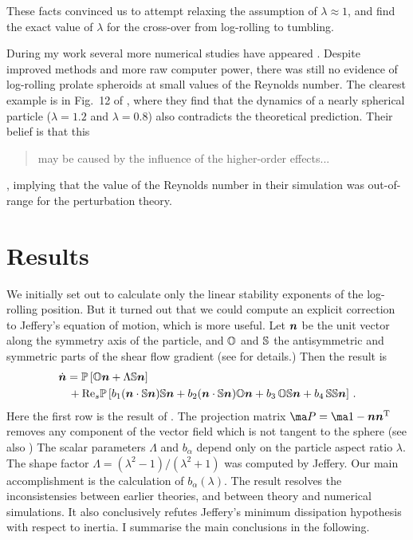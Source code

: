 \documentclass[thesis.tex]{subfiles}
\begin{document}
These facts convinced us to attempt relaxing the assumption of $\lambda\approx1$, and find the exact value of $\lambda$ for the cross-over from log-rolling to tumbling.

During my work several more numerical studies have appeared \cite{rosen2014,mao2014,rosen2015a,rosen2015b}. Despite improved methods and more raw computer power, there was still no evidence of log-rolling prolate spheroids at small values of the Reynolds number. The clearest example is in Fig.~12 of \citet{mao2014}, where they find that the dynamics of a nearly spherical particle ($\lambda=1.2$ and $\lambda=0.8$) also contradicts the theoretical prediction. Their belief is that this \blockquote{may be caused by the influence
of the higher-order effects...}, implying that the value of the Reynolds number in their simulation was out-of-range for the perturbation theory.

\section{Results}

We initially set out to calculate only the linear stability exponents of the log-rolling position. But it turned out that we could compute an explicit correction to Jeffery's equation of motion, which is more useful. Let $\mbox{\boldmath$n$}$ be the unit vector along the symmetry axis of the particle, and $\mathbb{O}$ and $\mathbb{S}$ the antisymmetric and symmetric parts of the shear flow gradient (see  for details.) Then the result is
\begin{align}
\eqnlab{ndoteffective}
  \dot {\ve n} &=  
\ma P\left[\ma O \ve n + \Lambda\ma S\ve n\right]\\
&\,+\Reys\ma P\left[b_1 (\ve n \cdot \ma S \ve n)\ma S \ve n
+ b_2 (\ve n \cdot \ma S \ve n)\ma O \ve n 
+b_3\,  \ma O \ma S \ve n 
+ b_4\,  \ma S \ma S \ve n\right]\,. \nn
\end{align}
Here the first row is the result of \citet{jeffery1922}. The projection matrix $\ma P=\ma 1 - \ve n \ve n\transpose$ removes any component of the vector field which is not tangent to the sphere (see also ) The scalar parameters $\Lambda$ and $b_\alpha$ depend only on the particle aspect ratio $\lambda$. The shape factor $\Lambda=(\lambda^2-1)/(\lambda^2+1)$ was computed by Jeffery. Our main accomplishment is the calculation of $b_\alpha(\lambda)$.
The result  resolves the inconsistensies between earlier theories, and between theory and numerical simulations. It also conclusively refutes Jeffery's minimum dissipation hypothesis with respect to inertia. I summarise the main conclusions in the following.
\end{document}
